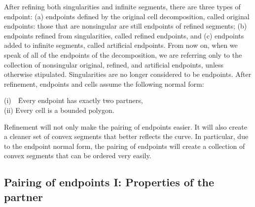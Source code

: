 After refining both singularities and infinite segments, there are 
three types of endpoint: 
(a) endpoints defined by the original cell decomposition, called original
endpoints: those that are nonsingular are still endpoints of refined
segments;
(b) endpoints refined from singularities, called refined endpoints,
and (c) endpoints added to infinite segments, called artificial endpoints.
From now on, when we speak of all of the endpoints of the decomposition, 
we are referring only to the collection of 
nonsingular original, refined, and artificial endpoints, 
unless otherwise stipulated.
Singularities are no longer considered to be endpoints.
After refinement, endpoints and cells assume the following normal form:

\begin{tabbing}
\indent (i)\ \ \= Every endpoint has exactly two partners,\\
\indent (ii) \> Every cell is a bounded polygon.
\end{tabbing}

\noindent Refinement will not only make the pairing of endpoints easier.
It will also create
a cleaner set of convex segments that better reflects the curve.
In particular, due to the endpoint normal form, the pairing of endpoints 
will create a collection of convex segments that can be ordered very easily.

\subsection{Pairing of endpoints I: Properties of the partner}
\label{ssp}

